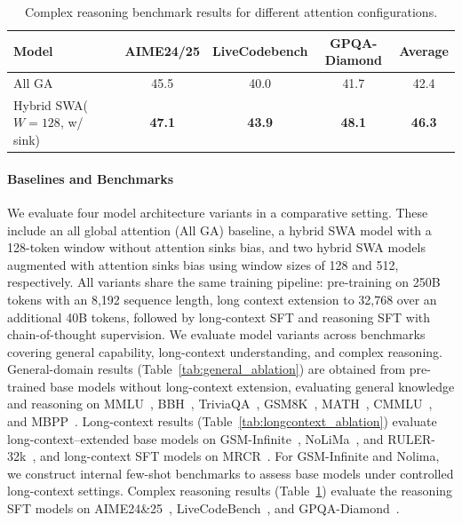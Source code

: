 \begin{table}[h!]
\centering
\small
\begin{tabular}{lcccc}
\toprule
\textbf{Model} & AIME24/25 & LiveCodebench & GPQA-Diamond & Average \\
\midrule
All GA          & 45.5 & 40.0 & 41.7 & 42.4  \\
Hybrid SWA($W = 128$, w/ sink)           & \textbf{47.1} & \textbf{43.9} & \textbf{48.1} & \textbf{46.3}   \\
\bottomrule
\end{tabular}
\caption{Complex reasoning benchmark results for different attention configurations.}
\label{tab:reasoning_ablation}
\end{table}

\paragraph{Baselines and Benchmarks} We evaluate four model architecture variants in a comparative setting. These include an all global attention (All GA) baseline, a hybrid SWA model with a 128-token window without attention sinks bias, and two hybrid SWA models augmented with attention sinks bias using window sizes of 128 and 512, respectively.
All variants share the same training pipeline: pre-training on 250B tokens with an 8,192 sequence length, long context extension to 32,768 over an additional 40B tokens, followed by long-context SFT and reasoning SFT with chain-of-thought supervision.
We evaluate model variants across benchmarks covering general capability, long-context understanding, and complex reasoning. General-domain results (Table~\ref{tab:general_ablation}) are obtained from pre-trained base models without long-context extension, evaluating general knowledge and reasoning on MMLU~\cite{hendrycks2020measuring}, BBH~\citep{suzgun2022challenging}, TriviaQA~\citep{joshi2017triviaqa}, GSM8K~\citep{cobbe2021training},  MATH~\citep{hendrycks2021measuring}, CMMLU~\citep{li2023cmmlu}, and MBPP~\citep{austin2021program}. Long-context results (Table~\ref{tab:longcontext_ablation}) evaluate long-context–extended base models on GSM-Infinite~\citep{zhou2025gsm}, NoLiMa~\citep{modarressi2025nolima}, and RULER-32k~\citep{hsieh2024ruler}, and long-context SFT models on MRCR~\citep{vodrahalli2024michelangelo}. For GSM-Infinite and Nolima, we construct internal few-shot benchmarks to assess base models under controlled long-context settings. Complex reasoning results (Table~\ref{tab:reasoning_ablation}) evaluate the reasoning SFT models on AIME24\&25~\citep{AIME}, LiveCodeBench~\citep{jain2024livecodebench}, and GPQA-Diamond~\citep{rein2024gpqa}. 

